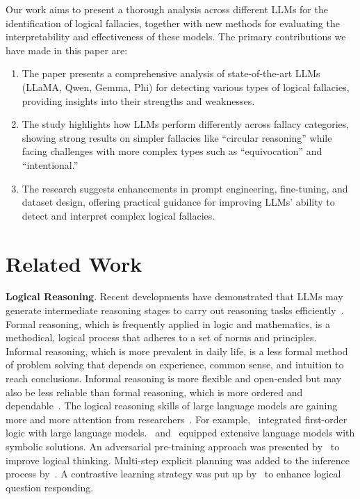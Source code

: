 \documentclass[runningheads]{llncs}
\begin{document}
Our work aims to present a thorough analysis across different LLMs for the identification of logical fallacies, together with new methods for evaluating the interpretability and effectiveness of these models. The primary contributions we have made in this paper are:
\begin{enumerate}
   \item The paper presents a comprehensive analysis of state-of-the-art LLMs (LLaMA, Qwen, Gemma, Phi) for detecting various types of logical fallacies, providing insights into their strengths and weaknesses.
   \item The study highlights how LLMs perform differently across fallacy categories, showing strong results on simpler fallacies like ``circular reasoning'' while facing challenges with more complex types such as ``equivocation'' and ``intentional.''
   \item The research suggests enhancements in prompt engineering, fine-tuning, and dataset design, offering practical guidance for improving LLMs' ability to detect and interpret complex logical fallacies.
   
\end{enumerate}

\section{Related Work}

\textbf{Logical Reasoning}. Recent developments have demonstrated that LLMs may generate intermediate reasoning stages to carry out reasoning tasks efficiently~\cite{shen2025reasoning,wang2024reasoning,yang2022language}. Formal reasoning, which is frequently applied in logic and mathematics, is a methodical, logical process that adheres to a set of norms and principles. Informal reasoning, which is more prevalent in daily life, is a less formal method of problem solving that depends on experience, common sense, and intuition to reach conclusions. Informal reasoning is more flexible and open-ended but may also be less reliable than formal reasoning, which is more ordered and dependable~\cite{huang2022towards}. The logical reasoning skills of large language models are gaining more and more attention from researchers~\cite{huang2025logical,xu2025large,zhou2022least,parmar2024logicbench}. 
For example,~\cite{olausson2023linc} integrated first-order logic with large language models.~\cite{pan2023logic} and~\cite{zhang2023improved} equipped extensive language models with symbolic solutions. An adversarial pre-training approach was presented by~\cite{pi2022logigan} to improve logical thinking. Multi-step explicit planning was added to the inference process by~\cite{zhang2023improved}.
A contrastive learning strategy was put up by~\cite{jiao2022merit} to enhance logical question responding. 
\end{document}
